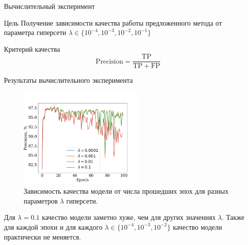 \documentclass{beamer}
\begin{document}
\begin{frame}{Вычислительный эксперимент}

\begin{block}{Цель}
Получение зависимости качества работы предложенного метода от параметра гиперсети $\lambda \in \{10^{-4}, 10^{-3}, 10^{-2}, 10^{-1}\}$
\end{block}

\begin{block}{Критерий качества}
 $$\mathrm{Precision} = \frac{\mathrm{TP}}{\mathrm{TP} + \mathrm{FP}}$$
\end{block}

\end{frame}

\begin{frame}{Результаты вычислительного эксперимента}

\begin{figure}
\caption{Зависимость качества модели от числа прошедших эпох для разных параметров $\lambda$ гиперсети.}
\includegraphics[width=0.55\textwidth]{main_100_exp}
\end{figure}

Для $\lambda = 0.1$ качество модели заметно хуже, чем для других значениях $\lambda$. Также для каждой эпохи и для каждого $\lambda \in \{10^{-4}, 10^{-3}, 10^{-2}\}$ качество модели практически не меняется.

\end{frame}
\end{document}

